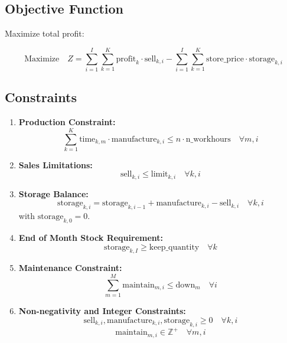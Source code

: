\documentclass{article}
\begin{document}
\subsection*{Objective Function}
Maximize total profit:

\[
\text{Maximize} \quad Z = \sum_{i=1}^{I} \sum_{k=1}^{K} \text{profit}_k \cdot \text{sell}_{k,i} - \sum_{i=1}^{I} \sum_{k=1}^{K} \text{store\_price} \cdot \text{storage}_{k,i}
\]

\subsection*{Constraints}

\begin{enumerate}
    \item \textbf{Production Constraint:}
    \[
    \sum_{k=1}^{K} \text{time}_{k,m} \cdot \text{manufacture}_{k,i} \leq n \cdot \text{n\_workhours} \quad \forall m, i
    \]

    \item \textbf{Sales Limitations:}
    \[
    \text{sell}_{k,i} \leq \text{limit}_{k,i} \quad \forall k, i
    \]

    \item \textbf{Storage Balance:}
    \[
    \text{storage}_{k,i} = \text{storage}_{k,i-1} + \text{manufacture}_{k,i} - \text{sell}_{k,i} \quad \forall k, i
    \]
    with \( \text{storage}_{k,0} = 0 \).

    \item \textbf{End of Month Stock Requirement:}
    \[
    \text{storage}_{k,I} \geq \text{keep\_quantity} \quad \forall k
    \]

    \item \textbf{Maintenance Constraint:}
    \[
    \sum_{m=1}^{M} \text{maintain}_{m,i} \leq \text{down}_{m} \quad \forall i
    \]

    \item \textbf{Non-negativity and Integer Constraints:}
    \[
    \text{sell}_{k,i}, \text{manufacture}_{k,i}, \text{storage}_{k,i} \geq 0 \quad \forall k, i
    \]
    \[
    \text{maintain}_{m,i} \in \mathbb{Z}^{+} \quad \forall m, i
    \]
\end{enumerate}
\end{document}
